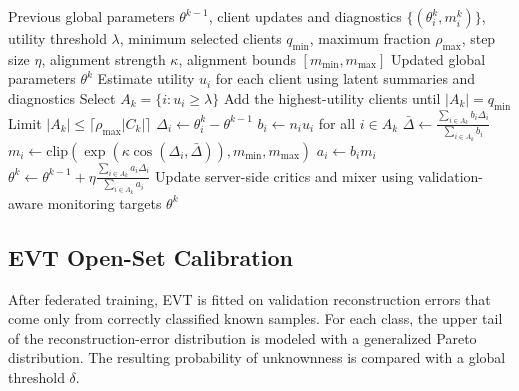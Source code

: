 \documentclass[10pt,twocolumn]{article}
\begin{document}
\begin{algorithm}[t]
\caption{FMRL-AVA Vector-Aligned Utility-Aware Client Selection and Aggregation}
\begin{algorithmic}[1]
\Require Previous global parameters $\theta^{k-1}$, client updates and diagnostics $\{(\theta_i^k,m_i^k)\}$, utility threshold $\lambda$, minimum selected clients $q_{\min}$, maximum fraction $\rho_{\max}$, step size $\eta$, alignment strength $\kappa$, alignment bounds $[m_{\min},m_{\max}]$
\Ensure Updated global parameters $\theta^k$
\State Estimate utility $u_i$ for each client using latent summaries and diagnostics
\State Select $A_k = \{i : u_i \ge \lambda\}$
  \State Add the highest-utility clients until $|A_k| = q_{\min}$
\EndIf
\State Limit $|A_k| \le \lceil \rho_{\max}|C_k| \rceil$
  \State $\Delta_i \gets \theta_i^k - \theta^{k-1}$
\EndFor
\State $b_i \gets n_i u_i$ for all $i \in A_k$
\State $\bar{\Delta} \gets \frac{\sum_{i \in A_k} b_i\Delta_i}{\sum_{i \in A_k} b_i}$
  \State $m_i \gets \mathrm{clip}(\exp(\kappa \cos(\Delta_i,\bar{\Delta})),m_{\min},m_{\max})$
  \State $a_i \gets b_i m_i$
\EndFor
\State $\theta^k \gets \theta^{k-1} + \eta \frac{\sum_{i \in A_k} a_i\Delta_i}{\sum_{i \in A_k} a_i}$
\State Update server-side critics and mixer using validation-aware monitoring targets
\State \Return $\theta^k$
\end{algorithmic}
\end{algorithm}

\subsection{EVT Open-Set Calibration}
After federated training, EVT is fitted on validation reconstruction errors that come only from correctly classified known samples. For each class, the upper tail of the reconstruction-error distribution is modeled with a generalized Pareto distribution. The resulting probability of unknownness is compared with a global threshold $\delta$.
\end{document}
